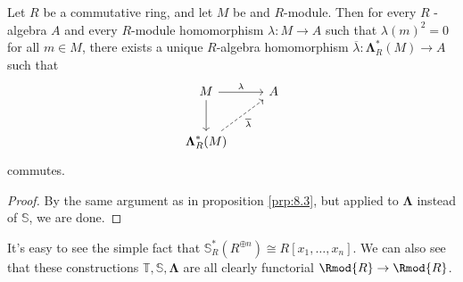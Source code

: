 \begin{proposition}\label{prp:8.4}
	Let $R$ be a commutative ring, and let $M$ be and $R$-module. Then for every $R$
-algebra $A$ and every $R$-module homomorphism $\lambda : M \to A$ such that $\lambda(m)^2=0$ for all $m\in M$, there exists a unique $R$-algebra homomorphism $\overline{\lambda } : \boldsymbol{\Lambda}_R^*(M) \to A$ such that
\[\begin{tikzcd}[row sep = 2.5em, column sep = 2.5em]
	M\arrow[r, "\lambda "]\arrow[d]&A\\
	\boldsymbol{\Lambda}_R^*(M)\arrow[ur, dashed, " \overline{\lambda } "']
\end{tikzcd}\]
commutes.
\end{proposition}
\begin{proof}
	By the same argument as in proposition \ref{prp:8.3}, but applied to $\boldsymbol{\Lambda} $ instead of $\mathbb{S} $, we are done.
\end{proof}

It's easy to see the simple fact that $\mathbb{S}_R^*(R^{\oplus n} )\cong R[x_1, \ldots, x_n ]$. We can also see that these constructions $\mathbb{T} ,\mathbb{S} ,\boldsymbol{\Lambda} $ are all clearly functorial $\Rmod{R} \to \Rmod{R} $.
